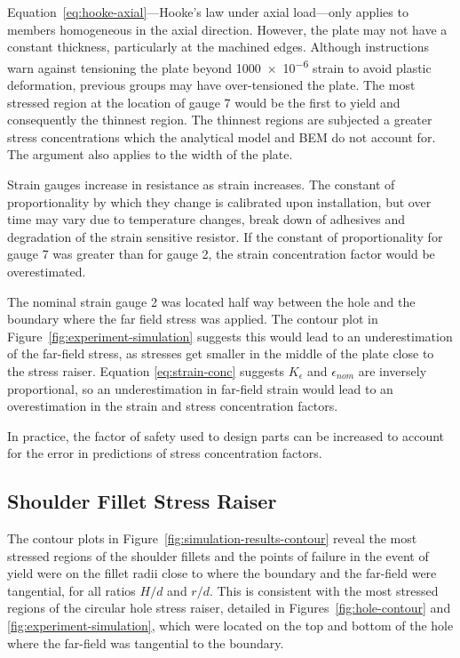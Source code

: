 \documentclass[a4paper,11pt,twocolumn]{article}
\newcommand{\BEM}{\textsc{BEM}\xspace}
\begin{document}
Equation~\eqref{eq:hooke-axial}---Hooke's law under axial load---only applies
to members homogeneous in the axial direction. However, the plate may not have a
constant thickness, particularly at the machined edges. Although instructions
warn against tensioning the plate beyond \num{1000e-6} strain to avoid plastic
deformation, previous groups may have over-tensioned the plate. The most
stressed region at the location of gauge 7 would be the first to yield and
consequently the thinnest region. The thinnest regions are subjected a greater
stress concentrations which the analytical model and \BEM do not account for.
The argument also applies to the width of the plate.

Strain gauges increase in resistance as strain increases. The constant of
proportionality by which they change is calibrated upon installation, but over
time may vary due to temperature changes, break down of adhesives and
degradation of the strain sensitive resistor. If the constant of
proportionality for gauge 7 was greater than for gauge 2, the strain
concentration factor would be overestimated.

The nominal strain gauge 2 was located half way between the hole and the
boundary where the far field stress was applied. The contour plot in
Figure~\ref{fig:experiment-simulation} suggests this would lead to an
underestimation of the far-field stress, as stresses get smaller in the middle
of the plate close to the stress raiser. Equation \eqref{eq:strain-conc}
suggests $K_{\epsilon}$ and $\epsilon_{nom}$ are inversely proportional, so an
underestimation in far-field strain would lead to an overestimation in the
strain and stress concentration factors.

In practice, the factor of safety used to design parts can be increased to
account for the error in predictions of stress concentration factors.

\subsection{Shoulder Fillet Stress Raiser}

The contour plots in Figure~\vref{fig:simulation-results-contour} reveal the
most stressed regions of the shoulder fillets and the points of failure in
the event of yield were on the fillet radii close to where the boundary and the
far-field were tangential, for all ratios $H/d$ and $r/d$. This is consistent
with the most stressed regions of the circular hole stress raiser, detailed in 
Figures~\ref{fig:hole-contour} and \ref{fig:experiment-simulation}, which were
located on the top and bottom of the hole where the far-field was tangential to
the boundary.
\end{document}
